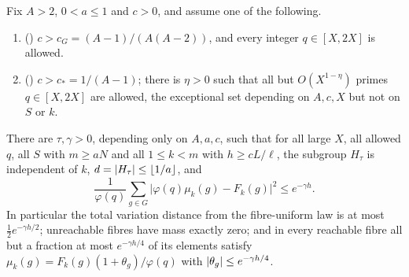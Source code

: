 \begin{theorem}\label{dir:thm:typical}
Fix $A>2$, $0<a\le1$ and $c>0$, and assume one of the following.
\begin{enumerate}[label=\textup{(\roman*)}]
\item \textup{(\stG)} $c>c_G=(A-1)/(A(A-2))$, and every integer $q\in[X,2X]$ is allowed.
\item \textup{(\stU)} $c>c_*=1/(A-1)$; there is $\eta>0$ such that all but $O(X^{1-\eta})$ primes
$q\in[X,2X]$ are allowed, the exceptional set depending on $A,c,X$ but not on $S$ or $k$.
\end{enumerate}
There are $\tau,\gamma>0$, depending only on $A,a,c$, such that for all large $X$, all allowed $q$, all
$S$ with $m\ge aN$ and all $1\le k<m$ with $h\ge cL/\ell$, the subgroup $H_\tau$ is independent of $k$,
$d=\lvert H_\tau\rvert\le\lfloor1/a\rfloor$, and
\begin{equation}\label{dir:eq:meansquare}
 \frac1{\varphi(q)}\sum_{g\in G}\bigl|\varphi(q)\mu_k(g)-F_k(g)\bigr|^2\le e^{-\gamma h}.
\end{equation}
In particular the total variation distance from the fibre-uniform law is at most $\tfrac12e^{-\gamma h/2}$;
unreachable fibres have mass exactly zero; and in every reachable fibre all but a fraction at most
$e^{-\gamma h/4}$ of its elements satisfy
$\mu_k(g)=F_k(g)(1+\theta_g)/\varphi(q)$ with $\lvert\theta_g\rvert\le e^{-\gamma h/4}$.
\end{theorem}

